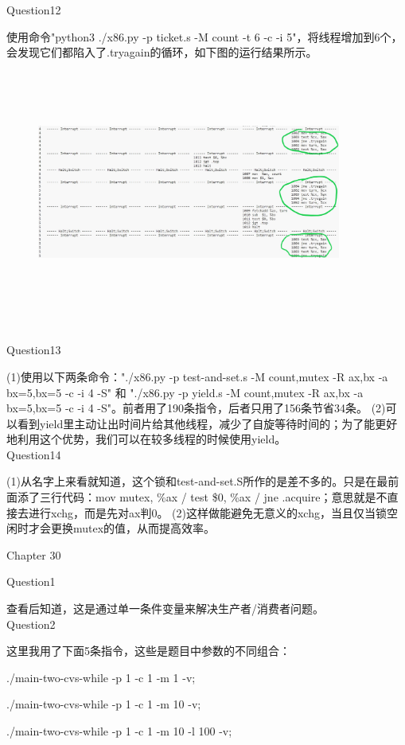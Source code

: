 \documentclass[11pt]{article}
\begin{document}
\noindent Question12\par
使用命令"python3 ./x86.py -p ticket.s -M count -t 6 -c -i 5"，将线程增加到6个，会发现它们都陷入了.tryagain的循环，如下图的运行结果所示。
\begin{figure}[h]
    \centering
    \includegraphics[height=8cm,width=10cm]{hw8-3.jpg}
\end{figure}\\
Question13\par
(1)使用以下两条命令："./x86.py -p test-and-set.s -M count,mutex -R ax,bx -a bx=5,bx=5 -c -i 4 -S" 和 "./x86.py -p yield.s -M count,mutex -R ax,bx -a bx=5,bx=5 -c -i 4 -S"。前者用了190条指令，后者只用了156条节省34条。
(2)可以看到yield里主动让出时间片给其他线程，减少了自旋等待时间的；为了能更好地利用这个优势，我们可以在较多线程的时候使用yield。\\
Question14\par
(1)从名字上来看就知道，这个锁和test-and-set.S所作的是差不多的。只是在最前面添了三行代码：mov  mutex, \%ax / test \$0, \%ax / jne .acquire；意思就是不直接去进行xchg，而是先对ax判0。
(2)这样做能避免无意义的xchg，当且仅当锁空闲时才会更换mutex的值，从而提高效率。
\newpage
\begin{Large}
    \noindent Chapter 30\\
\end{Large}
Question1\par
查看后知道，这是通过单一条件变量来解决生产者/消费者问题。\\
Question2\par
这里我用了下面5条指令，这些是题目中参数的不同组合：\par
./main-two-cvs-while -p 1 -c 1 -m 1 -v;\par
./main-two-cvs-while -p 1 -c 1 -m 10 -v;\par
./main-two-cvs-while -p 1 -c 1 -m 10 -l 100 -v;\par
\end{document}
